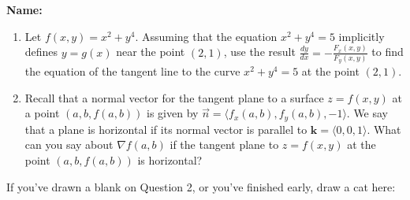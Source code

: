 \documentclass[12pt]{article}
\newcommand{\di}{\displaystyle}
\renewcommand{\k}{\mathbf{k}}
\begin{document}
{\bf \Large Name:}
\thispagestyle{fancy}

 \begin{enumerate}
 \item Let $f(x,y) = x^2+y^4$. Assuming that the equation $x^2+y^4=5$ implicitly defines $y=g(x)$ near the point $(2,1)$, use the result $\di \frac{dy}{dx} = -\frac{F_x(x,y)}{F_y(x,y)}$ to find the equation of the tangent line to the curve $x^2+y^4=5$ at the point $(2,1)$.


\vspace{3.75in}

 \item Recall that a normal vector for the tangent plane to a surface $z=f(x,y)$ at a point $(a,b,f(a,b))$ is given by $\vec{n} = \langle f_x(a,b), f_y(a,b), -1\rangle$. We say that a plane is horizontal if its normal vector is parallel to $\k = \langle 0,0,1\rangle$. What can you say about $\nabla f(a,b)$ if the tangent plane to $z=f(x,y)$ at the point $(a,b,f(a,b))$ is horizontal?
 \end{enumerate}

\vspace{1.5in}

If you've drawn a blank on Question 2, or you've finished early, draw a cat here:
\end{document}
